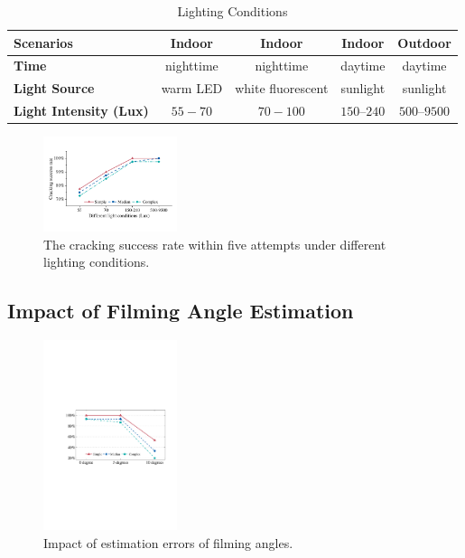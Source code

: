             \begin{table}[!t]
            \centering
            \caption{Lighting Conditions}
            \label{tab:light}
            \scriptsize
            \begin{tabular}{lcccc}
                \toprule
                \textbf{Scenarios} & Indoor  & Indoor & Indoor  & Outdoor\\
                \midrule
                \textbf{Time} & nighttime &  nighttime & daytime & daytime \\
                \textbf{Light Source}& warm LED & white fluorescent & sunlight &  sunlight \\
                \textbf{Light Intensity (Lux)} & $55-70$ & $70-100$ & $150$--$240$ & $500$--$9500$ \\
                \bottomrule
            \end{tabular}
            \vspace{-2mm}
        \end{table}


       \begin{figure}[t!]
            \centering
            \includegraphics[width=0.35\textwidth]{fig/light.pdf}
            \vspace{-2mm}
            \caption{The cracking success rate within five attempts under different lighting conditions.}
            \label{fig:light}
        \end{figure}



    \subsection{Impact of Filming Angle Estimation \label{sec:angle}}
        \begin{figure}[!t]
        \centering
        \includegraphics[width=0.35\textwidth]{fig/15.pdf}
        \vspace{-2mm}
        \caption{Impact of estimation errors of filming angles.}
        \vspace{-2mm}
        \label{fig:fig15}
    \end{figure}

